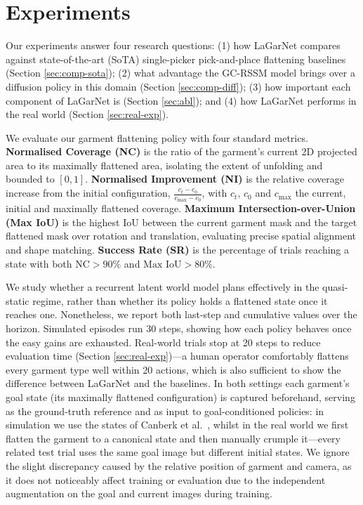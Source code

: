 \documentclass[journal]{IEEEtran}
\newif\ifshowrev\showrevtrue
\newcommand{\rev}[1]{\ifshowrev\textcolor{revblue}{#1}\else#1\fi}
\newif\ifshowirev\showirevtrue
\newcommand{\irev}[1]{\ifshowirev\textcolor{irevgreen}{#1}\else#1\fi}
\newif\ifshowrrev\showrrevtrue
\newcommand{\rrev}[1]{\ifshowrrev\textcolor{rrevred}{#1}\else#1\fi}
\begin{document}
\section{Experiments} \label{sec:experiments}

\rev{Our experiments answer four research questions: (1) how LaGarNet compares against state-of-the-art (SoTA) single-picker pick-and-place flattening baselines (Section \ref{sec:comp-sota}); (2) what advantage the GC-RSSM model brings over a diffusion policy in this domain (Section \ref{sec:comp-diff}); (3) how important each component of LaGarNet is (Section \ref{sec:abl}); and (4) how LaGarNet performs in the real world (Section \ref{sec:real-exp}).}



\rev{We evaluate our garment flattening policy with four standard metrics. \textbf{Normalised Coverage (NC)} is the ratio of the garment's current 2D projected area to its maximally flattened area, isolating the extent of unfolding and bounded to $[0,1]$. \textbf{Normalised Improvement (NI)} is the relative coverage increase from the initial configuration, $\frac{c_t - c_0}{c_{\text{max}} - c_0}$, with $c_t$, $c_0$ and $c_{\text{max}}$ the current, initial and maximally flattened coverage. \textbf{Maximum Intersection-over-Union (Max IoU)} is the highest IoU between the current garment mask and the target flattened mask over rotation and translation, evaluating precise spatial alignment and shape matching. \textbf{Success Rate (SR)} is the percentage of trials reaching a state with both $\text{NC} > 90\%$ and $\text{Max IoU} > 80\%$.}

\rev{We study whether a recurrent latent world model plans effectively in the quasi-static regime, rather than whether its policy holds a flattened state once it reaches one. Nonetheless, we report both last-step and cumulative values over the horizon. Simulated episodes run 30 steps, showing how each policy behaves once the easy gains are exhausted. Real-world trials stop at 20 steps to reduce evaluation time (Section \ref{sec:real-exp})---a human operator comfortably flattens every garment type well within 20 actions, \irev{which is \rrev{also} sufficient to show the difference between LaGarNet and the baselines}.} In both settings each garment's goal state (its maximally flattened configuration) is captured beforehand, serving as the ground-truth reference and as input to goal-conditioned policies: in simulation we use the states of Canberk et al.~\cite{canberk2023cloth}, whilst in the real world we first flatten the garment \rrev{to a canonical state} and then manually crumple it\rev{\rrev{---every related test trial uses the same goal image but different initial states.}} We ignore the slight discrepancy caused by the relative position of garment and camera, as it does not noticeably affect training or evaluation \rev{due to the independent augmentation on the goal and current images during training}.
\end{document}
